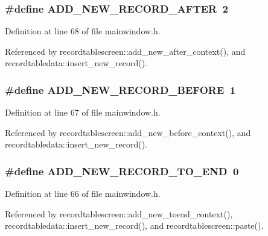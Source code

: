 \subsubsection{\setlength{\rightskip}{0pt plus 5cm}\#define ADD\_\-NEW\_\-RECORD\_\-AFTER~2}\label{mainwindow_8h_3850518597a1aac6ea8540bdb4dbc7ff}




Definition at line 68 of file mainwindow.h.

Referenced by recordtablescreen::add\_\-new\_\-after\_\-context(), and recordtabledata::insert\_\-new\_\-record().
\subsubsection{\setlength{\rightskip}{0pt plus 5cm}\#define ADD\_\-NEW\_\-RECORD\_\-BEFORE~1}\label{mainwindow_8h_a265280e56bf1f4bf9309e95c12d0980}




Definition at line 67 of file mainwindow.h.

Referenced by recordtablescreen::add\_\-new\_\-before\_\-context(), and recordtabledata::insert\_\-new\_\-record().
\subsubsection{\setlength{\rightskip}{0pt plus 5cm}\#define ADD\_\-NEW\_\-RECORD\_\-TO\_\-END~0}\label{mainwindow_8h_3ff28b5932200d5e6cac920029f0df0d}




Definition at line 66 of file mainwindow.h.

Referenced by recordtablescreen::add\_\-new\_\-toend\_\-context(), recordtabledata::insert\_\-new\_\-record(), and recordtablescreen::paste().